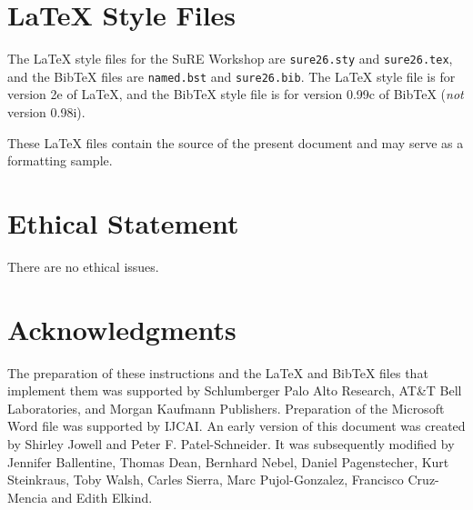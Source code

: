 \documentclass{article}
\begin{document}
\section{\LaTeX{} Style Files}\label{stylefiles}

The \LaTeX{} style files for the SuRE Workshop are {\tt sure26.sty}
and {\tt sure26.tex}, and the Bib\TeX{} files are {\tt named.bst} and
	{\tt sure26.bib}. The \LaTeX{} style file is for version 2e of
\LaTeX{}, and the Bib\TeX{} style file is for version 0.99c of
Bib\TeX{} ({\em not} version 0.98i).

These \LaTeX{} files contain the source of the present document and
may serve as a formatting sample.

\appendix

\section*{Ethical Statement}

There are no ethical issues.

\section*{Acknowledgments}

The preparation of these instructions and the \LaTeX{} and Bib\TeX{}
files that implement them was supported by Schlumberger Palo Alto
Research, AT\&T Bell Laboratories, and Morgan Kaufmann Publishers.
Preparation of the Microsoft Word file was supported by IJCAI.  An
early version of this document was created by Shirley Jowell and Peter
F. Patel-Schneider.  It was subsequently modified by Jennifer
Ballentine, Thomas Dean, Bernhard Nebel, Daniel Pagenstecher,
Kurt Steinkraus, Toby Walsh, Carles Sierra, Marc Pujol-Gonzalez,
Francisco Cruz-Mencia and Edith Elkind.




\end{document}
